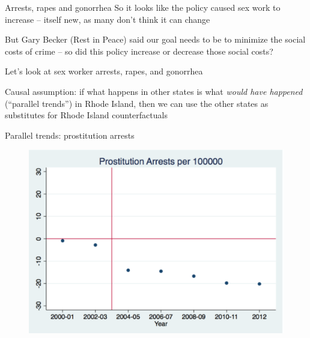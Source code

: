 \documentclass{beamer}
\begin{document}
\clearpage
\newpage


\begin{frame}{Arrests, rapes and gonorrhea}
So it looks like the policy caused sex work to increase -- itself new, as many don't think it can change

\bigskip

But Gary Becker (Rest in Peace) said our goal needs to be to minimize the social costs of crime -- so did this policy increase or decrease those social costs?

\bigskip

Let's look at sex worker arrests, rapes, and gonorrhea

\bigskip

Causal assumption: if what happens in other states is what \emph{would have happened}  (``parallel trends'') in Rhode Island, then we can use the other states as substitutes for Rhode Island counterfactuals

\end{frame}



\begin{frame}[shrink=20]{Parallel trends: prostitution arrests}
	\begin{figure}
	\includegraphics[scale=0.35]{./lecture_includes/figure2c.pdf}
	\end{figure}
\end{frame}
\end{document}
